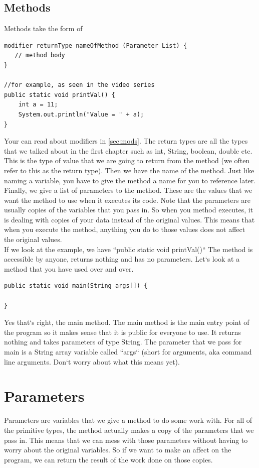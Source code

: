 \documentclass[11]{article}
\begin{document}
\subsection{Methods}
Methods take the form of
\begin{lstlisting}
modifier returnType nameOfMethod (Parameter List) {
   // method body
}

//for example, as seen in the video series
public static void printVal() {
    int a = 11;
    System.out.println("Value = " + a);
}

\end{lstlisting}

Your can read about modifiers in \autoref{sec:mods}. The return types are all the types that we talked about in the first chapter such as int, String, boolean, double etc. This is the type of value that we are going to return from the method (we often refer to this as the return type). Then we have the name of the method. Just like naming a variable, you have to give the method a name for you to reference later. Finally, we give a list of parameters to the method. These are the values that we want the method to use when it executes its code. Note that the parameters are usually copies of the variables that you pass in. So when you method executes, it is dealing with copies of your data instead of the original values. This means that when you execute the method, anything you do to those values does not affect the original values.\\

If we look at the example, we have ``public static void printVal()`` The method is accessible by anyone, returns nothing and has no parameters. Let`s look at a method that you have used over and over.

\begin{lstlisting}
public static void main(String args[]) {

}
\end{lstlisting}
Yes that`s right, the main method. The main method is the main entry point of the program so it makes sense that it is public for everyone to use. It returns nothing and takes parameters of type String. The parameter that we pass for main is a String array variable called ``args`` (short for arguments, aka command line arguments. Don`t worry about what this means yet).

\section{Parameters}
Parameters are variables that we give a method to do some work with. For all of the primitive types, the method actually makes a copy of the parameters that we pass in. This means that we can mess with those parameters without having to worry about the original variables. So if we want to make an affect on the program, we can return the result of the work done on those copies.\\
\end{document}

